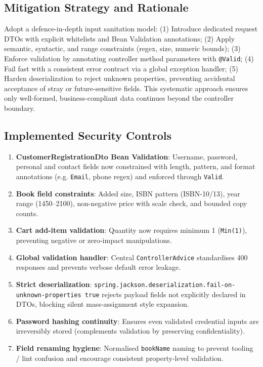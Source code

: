 \documentclass[]{UCD_CS_FYP_Report}
\begin{document}
\subsection*{Mitigation Strategy and Rationale}
Adopt a defence-in-depth input sanitation model: (1) Introduce dedicated request DTOs with explicit whitelists and Bean Validation annotations; (2) Apply semantic, syntactic, and range constraints (regex, size, numeric bounds); (3) Enforce validation by annotating controller method parameters with \texttt{@Valid}; (4) Fail fast with a consistent error contract via a global exception handler; (5) Harden deserialization to reject unknown properties, preventing accidental acceptance of stray or future-sensitive fields. This systematic approach ensures only well-formed, business-compliant data continues beyond the controller boundary.


\subsection*{Implemented Security Controls}
\begin{enumerate}
	\item \textbf{CustomerRegistrationDto  Bean Validation}: Username, password, personal and contact fields now constrained with length, pattern, and format annotations (e.g. \texttt{Email}, phone regex) and enforced through \texttt{Valid}.
	\item \textbf{Book field constraints}: Added size, ISBN pattern (ISBN-10/13), year range (1450–2100), non-negative price with scale check, and bounded copy counts.
	\item \textbf{Cart add-item validation}: Quantity now requires minimum 1 (\texttt{Min(1)}), preventing negative or zero-impact manipulations.
	\item \textbf{Global validation handler}: Central \texttt{ControllerAdvice} standardises 400 responses and prevents verbose default error leakage.
	\item \textbf{Strict deserialization}: \texttt{spring.jackson.deserialization.fail-on-unknown-properties true} rejects payload fields not explicitly declared in DTOs, blocking silent mass-assignment style expansion.
	\item \textbf{Password hashing continuity}: Ensures even validated credential inputs are irreversibly stored (complements validation by preserving confidentiality).
	\item \textbf{Field renaming hygiene}: Normalised \texttt{bookName} naming to prevent tooling / lint confusion and encourage consistent property-level validation.
\end{enumerate}
\end{document}
